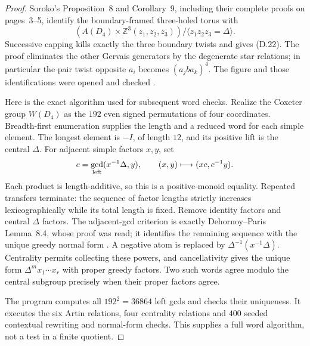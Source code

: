 \begin{proof}
Soroko's Proposition~8 and Corollary~9, including their
complete proofs on pages~3--5, identify the boundary-framed
three-holed torus with
\[
 (A(D_4)\times\mathbb Z^3(z_1,z_2,z_3))
       /\langle z_1z_2z_3=\Delta\rangle.
\]
Successive capping kills exactly the three boundary twists
and gives (D.22).  The proof eliminates the other Gervais
generators by the degenerate star relations; in particular
the pair twist opposite $a_i$ becomes $(a_jba_k)^4$.
The figure and those identifications were opened and checked
\cite[Proposition~8 and Corollary~9]{D_Soroko2020}.

Here is the exact algorithm used for subsequent word checks.
Realize the Coxeter group $W(D_4)$ as the $192$ even signed
permutations of four coordinates.  Breadth-first enumeration
supplies the length and a reduced word for each simple element.
The longest element is $-I$, of length $12$, and its positive
lift is the central $\Delta$.  For adjacent simple factors
$x,y$, set
\[
 c=\gcd_{\rm left}(x^{-1}\Delta,y),\qquad
 (x,y)\longmapsto(xc,c^{-1}y).
\]
Each product is length-additive, so this is a positive-monoid
equality.  Repeated transfers terminate: the sequence of
factor lengths strictly increases lexicographically while
its total length is fixed.  Remove identity factors and
central $\Delta$ factors.  The adjacent-gcd criterion is
exactly Dehornoy--Paris Lemma~8.4, whose proof was read;
it identifies the remaining sequence with the unique
greedy normal form \cite[Sections~7--8]{D_DehornoyParis1999}.
A negative atom is replaced by
$\Delta^{-1}(x^{-1}\Delta)$.  Centrality permits collecting
these powers, and cancellativity gives the unique form
$\Delta^m x_1\cdots x_r$ with proper greedy factors.
Two such words agree modulo the central subgroup precisely
when their proper factors agree.

The program computes all $192^2=36864$ left gcds and checks
their uniqueness.  It executes the six Artin relations, four
centrality relations and $400$ seeded contextual rewriting
and normal-form checks.  This supplies a full word algorithm,
not a test in a finite quotient.


\end{proof}

